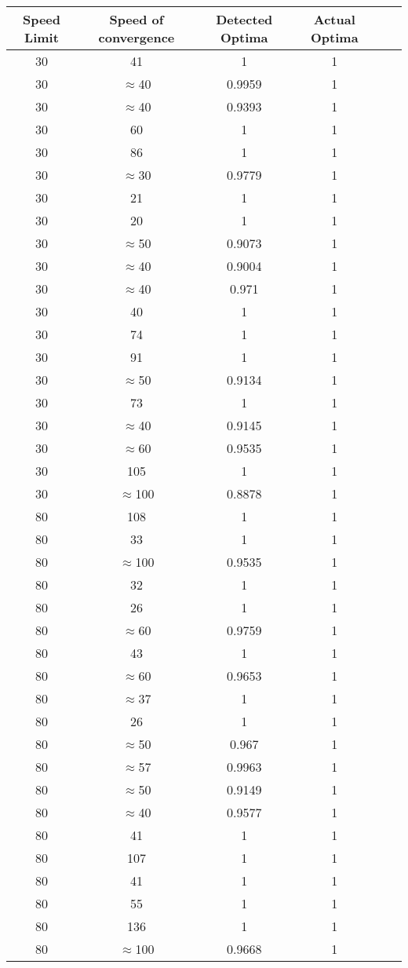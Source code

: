 \documentclass[12pt]{article}
\begin{document}
\begin{table}[h!]
\centering
\begin{tabular}{|c|c|c|c|c|c|}
\hline
\textbf{Speed Limit} & Speed of convergence & Detected Optima & Actual Optima \\ \hline
\hline
30 & 41 & 1 & 1 \\ \hline
30 & $\approx$40 & 0.9959 & 1 \\ \hline
30 & $\approx$40 & 0.9393 & 1 \\ \hline
30 & 60 & 1 & 1 \\ \hline
30 & 86 & 1 & 1 \\ \hline
30 & $\approx$30 & 0.9779 & 1 \\ \hline
30 & 21 & 1 & 1 \\ \hline
30 & 20 & 1 & 1 \\ \hline
30 & $\approx$50 & 0.9073 & 1 \\ \hline
30 & $\approx$40 & 0.9004 & 1 \\ \hline
30 & $\approx$40 & 0.971 & 1 \\ \hline
30 & 40 & 1 & 1 \\ \hline
30 & 74 & 1 & 1 \\ \hline
30 & 91 & 1 & 1 \\ \hline
30 & $\approx$50 & 0.9134 & 1 \\ \hline
30 & 73 & 1 & 1 \\ \hline
30 & $\approx$40 & 0.9145 & 1 \\ \hline
30 & $\approx$60 & 0.9535 & 1 \\ \hline
30 & 105 & 1 & 1 \\ \hline
30 & $\approx$100 & 0.8878 & 1 \\ \hline
80 & 108 & 1 & 1 \\ \hline
80 & 33 & 1 & 1 \\ \hline
80 & $\approx$100 & 0.9535 & 1 \\ \hline
80 & 32 & 1 & 1 \\ \hline
80 & 26 & 1 & 1 \\ \hline
80 & $\approx$60 & 0.9759 & 1 \\ \hline
80 & 43 & 1 & 1 \\ \hline
80 & $\approx$60 & 0.9653 & 1 \\ \hline
80 & $\approx$37 & 1 & 1 \\ \hline
80 & 26 & 1 & 1 \\ \hline
80 & $\approx$50 & 0.967 & 1 \\ \hline
80 & $\approx$57 & 0.9963 & 1 \\ \hline
80 & $\approx$50 & 0.9149 & 1 \\ \hline
80 & $\approx$40 & 0.9577 & 1 \\ \hline
80 & 41 & 1 & 1 \\ \hline
80 & 107 & 1 & 1 \\ \hline
80 & 41 & 1 & 1 \\ \hline
80 & 55 & 1 & 1 \\ \hline
80 & 136 & 1 & 1 \\ \hline
80 & $\approx$100 & 0.9668 & 1 \\ \hline
\end{tabular}
\end{table}
\end{document}
